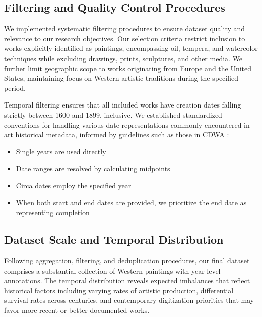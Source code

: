 \documentclass[10pt,twocolumn,letterpaper]{article}
\begin{document}
\subsection{Filtering and Quality Control Procedures}

We implemented systematic filtering procedures to ensure dataset quality and relevance to our research objectives. Our selection criteria restrict inclusion to works explicitly identified as paintings, encompassing oil, tempera, and watercolor techniques while excluding drawings, prints, sculptures, and other media. We further limit geographic scope to works originating from Europe and the United States, maintaining focus on Western artistic traditions during the specified period.

Temporal filtering ensures that all included works have creation dates falling strictly between 1600 and 1899, inclusive. We established standardized conventions for handling various date representations commonly encountered in art historical metadata, informed by guidelines such as those in CDWA \cite{GettyCDWA}:
\begin{itemize}
\item Single years are used directly
\item Date ranges are resolved by calculating midpoints  
\item Circa dates employ the specified year
\item When both start and end dates are provided, we prioritize the end date as representing completion
\end{itemize}


\subsection{Dataset Scale and Temporal Distribution}

Following aggregation, filtering, and deduplication procedures, our final dataset comprises a substantial collection of Western paintings with year-level annotations. The temporal distribution reveals expected imbalances that reflect historical factors including varying rates of artistic production, differential survival rates across centuries, and contemporary digitization priorities that may favor more recent or better-documented works.
\end{document}
